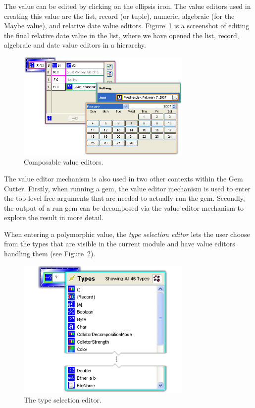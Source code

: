 \documentclass[preprint]{sigplanconf}
\begin{document}
The value can be edited by clicking on the ellipsis icon. The value
editors used in creating this value are the list, record (or tuple),
numeric, algebraic (for the Maybe value), and relative date value
editors. Figure~\ref{fig:valueEntry-b} is a screenshot of editing the final
relative date value in the list, where we have opened the list, record,
algebraic and date value editors in a hierarchy.

\begin{figure}[htb]
  \centering
  \includegraphics[width=20pc]{valueEntry-b.png}
  \caption{Composable value editors.}
  \label{fig:valueEntry-b}
\end{figure}

The value editor mechanism is also used in two other contexts within
the Gem Cutter.  Firstly, when running a gem, the value editor
mechanism is used to enter the top-level free arguments that are
needed to actually run the gem. Secondly, the output of a run gem can
be decomposed via the value editor mechanism to explore the result in
more detail.

When entering a polymorphic value, the {\it type selection editor}
lets the user choose from the types that are visible in the current
module and have value editors handling them (see
Figure~\ref{fig:typeSelection}).

\begin{figure}[htb]
  \centering
  \includegraphics[width=20pc]{typeSelection.png}
  \caption{The type selection editor.}
  \label{fig:typeSelection}
\end{figure}
\end{document}
